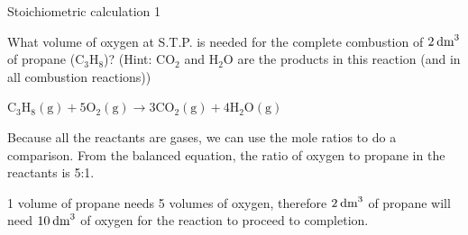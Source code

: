 \label{m38712*secfhsst!!!underscore!!!id1903} 
      \begin{wex}{Stoichiometric calculation 1 }
{

      \label{m38712*probfhsst!!!underscore!!!id1904}
      \label{m38712*id275479}What volume of oxygen at S.T.P. is needed for the complete combustion of $2\phantom{\rule{2pt}{0ex}}{\text{dm}}^{3}$ of propane ($\text{C}{}_{3}\text{H}{}_{8}$)? (Hint: $\text{CO}{}_{2}$ and $\text{H}{}_{2}\text{O}$ are the products in this reaction (and in all combustion reactions))
      }
{
      \label{m38712*id284189}${\text{C}}_{3}{\text{H}}_{8}\left(\text{g}\right)+5{\text{O}}_{2}\left(\text{g}\right)\to 3\text{C}{\text{O}}_{2}\left(\text{g}\right)+4{\text{H}}_{2}\text{O}\left(\text{g}\right)$
       
      \label{m38712*id284294}Because all the reactants are gases, we can use the mole ratios to do a comparison. From the balanced equation, the ratio of oxygen to propane in the reactants is 5:1.\par 
      \label{m38712*id284304}1 volume of propane needs 5 volumes of oxygen, therefore $2\phantom{\rule{2pt}{0ex}}{\text{dm}}^{3}$ of propane will need $10\phantom{\rule{2pt}{0ex}}{\text{dm}}^{3}$ of oxygen for the reaction to proceed to completion. 
}
    \end{wex}
    \noindent
\label{m38712*secfhsst!!!underscore!!!id1972} 
